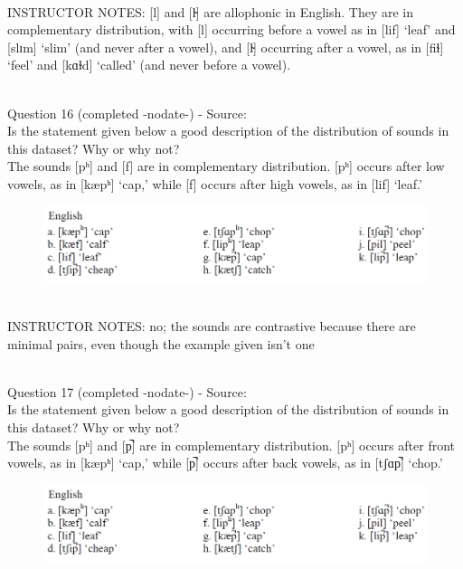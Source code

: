 \documentclass[12pt]{article}
\begin{document}
~\\
INSTRUCTOR NOTES: [l] and [l̴] are allophonic in English. They are in complementary distribution, with [l] occurring before a vowel as in [lif] ‘leaf’ and [slɪm] ‘slim’ (and never after a vowel), and [l̴] occurring after a vowel, as in [fiɫ] ‘feel’ and [kɑɫd] ‘called’ (and never before a vowel).


~\\

{\large Question 16} (completed -nodate-) - Source: \\

Is the statement given below a good description of the distribution of sounds in this dataset? Why or why not?\\

The sounds {[pʰ]} and {[f]} are in complementary distribution. {[pʰ]} occurs after low vowels, as in {[kæpʰ]} ‘cap,’ while {[f]} occurs after high vowels, as in {[lif]} ‘leaf.’

\begin{figure}[H]
\includegraphics{../images/english_labials.png}
\end{figure}

~\\
INSTRUCTOR NOTES: no; the sounds are contrastive because there are minimal pairs, even though the example given isn't one


~\\

{\large Question 17} (completed -nodate-) - Source: \\

Is the statement given below a good description of the distribution of sounds in this dataset? Why or why not?\\

The sounds {[pʰ]} and {[p̚]} are in complementary distribution. {[pʰ]} occurs after front vowels, as in {[kæpʰ]} ‘cap,’ while {[p̚]} occurs after back vowels, as in {[tʃɑp̚]} ‘chop.’

\begin{figure}[H]
\includegraphics{../images/english_labials.png}
\end{figure}
\end{document}
